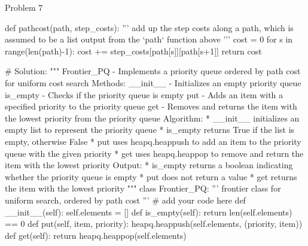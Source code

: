 \begin{problem}{Problem 7}
\begin{highlight}[Solution]
\begin{code}[Python]
    def pathcost(path, step_costs):
        '''
        add up the step costs along a path, which is assumed to be a list output from the `path` function above
        '''
        cost = 0
        for s in range(len(path)-1):
            cost += step_costs[path[s]][path[s+1]]
        return cost
    
    # Solution:
    """ Frontier_PQ - Implements a priority queue ordered by path cost for uniform cost search
        Methods:
            __init__ - Initializes an empty priority queue
            is_empty - Checks if the priority queue is empty
            put - Adds an item with a specified priority to the priority queue
            get - Removes and returns the item with the lowest priority from the priority queue
        Algorithm:
            * __init__ initializes an empty list to represent the priority queue
            * is_empty returns True if the list is empty, otherwise False
            * put uses heapq.heappush to add an item to the priority queue with the given priority
            * get uses heapq.heappop to remove and return the item with the lowest priority
        Output:
            * is_empty returns a boolean indicating whether the priority queue is empty
            * put does not return a value
            * get returns the item with the lowest priority
    """
    class Frontier_PQ:
        ''' frontier class for uniform search, ordered by path cost '''
        # add your code here
        def __init__(self):
            self.elements = []
        def is_empty(self):
            return len(self.elements) == 0
        def put(self, item, priority):
            heapq.heappush(self.elements, (priority, item))
        def get(self):
            return heapq.heappop(self.elements)
        

\end{code}
\end{highlight}
\end{problem}
